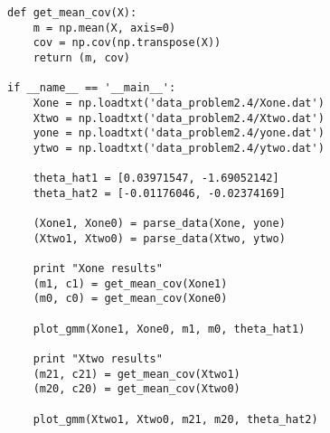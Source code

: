 \documentclass[11pt]{article}
\begin{document}
\begin{lstlisting}
def get_mean_cov(X):
    m = np.mean(X, axis=0)
    cov = np.cov(np.transpose(X))
    return (m, cov)

if __name__ == '__main__':
    Xone = np.loadtxt('data_problem2.4/Xone.dat')
    Xtwo = np.loadtxt('data_problem2.4/Xtwo.dat')
    yone = np.loadtxt('data_problem2.4/yone.dat')
    ytwo = np.loadtxt('data_problem2.4/ytwo.dat')

    theta_hat1 = [0.03971547, -1.69052142]
    theta_hat2 = [-0.01176046, -0.02374169]

    (Xone1, Xone0) = parse_data(Xone, yone)
    (Xtwo1, Xtwo0) = parse_data(Xtwo, ytwo)

    print "Xone results"
    (m1, c1) = get_mean_cov(Xone1)
    (m0, c0) = get_mean_cov(Xone0)

    plot_gmm(Xone1, Xone0, m1, m0, theta_hat1)

    print "Xtwo results"
    (m21, c21) = get_mean_cov(Xtwo1)
    (m20, c20) = get_mean_cov(Xtwo0)

    plot_gmm(Xtwo1, Xtwo0, m21, m20, theta_hat2)

\end{lstlisting}
\end{document}
